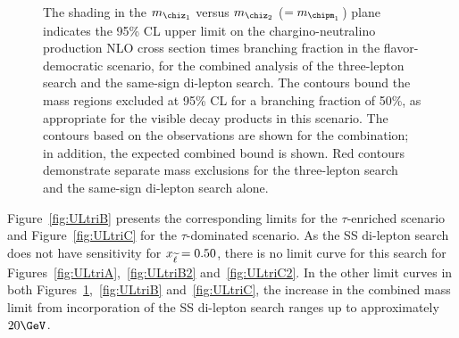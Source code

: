 \begin{figure}[!p]
\begin{center}
\caption{
The shading in the $m_{\chiz_1}$ versus $m_{\chiz_2}$
($=m_{\chipm_1}$) plane indicates the 95\% CL upper limit on the
chargino-neutralino production NLO cross section times branching fraction
in the flavor-democratic scenario, for the combined analysis of the
three-lepton search and the same-sign di-lepton search.  
The contours bound the mass regions excluded at 95\%
CL for a branching fraction of 50\%, as appropriate for the visible
decay products in this scenario. The contours based on the
observations are shown for the combination; in addition, the expected 
combined bound is shown. Red contours demonstrate separate mass exclusions 
for the three-lepton search and the same-sign di-lepton search alone.
}
\label{fig:ULtriAss}
\end{center}
\end{figure}

Figure~\ref{fig:ULtriB} presents the corresponding limits for the $\tau$-enriched scenario 
and Figure~\ref{fig:ULtriC} for the $\tau$-dominated scenario.  
As the SS di-lepton search does not have sensitivity for $x_{\widetilde{\ell}}=0.50$, there is no limit curve for this search
for Figures~\ref{fig:ULtriA},~\ref{fig:ULtriB2} and~\ref{fig:ULtriC2}.  In the other limit curves in both
Figures~\ref{fig:ULtriAss},~\ref{fig:ULtriB} and~\ref{fig:ULtriC}, the increase in the
combined mass limit from incorporation of the SS di-lepton search
ranges up to approximately $20\GeV$.

